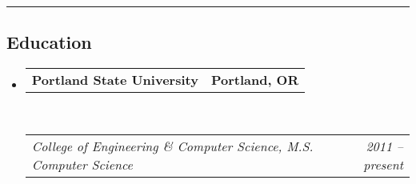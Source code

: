 \documentclass[10pt,letterpaper]{article}
\makeatletter
\newcommand{\headerrow}[2]
{\begin{tabular*}{\linewidth}{l@{\extracolsep{\fill}}r}
	#1 &
	#2 \\
\end{tabular*}}
\makeatother
\begin{document}
\hrule
\vspace{-0.4em}
\subsection*{Education}

\begin{itemize}
	\parskip=0.1em

	\item 
	\headerrow
		{\textbf{Portland State University}}
		{\textbf{Portland, OR}}
	\\
	\headerrow
		{\emph{College of Engineering \& Computer Science, M.S. Computer Science}}
		{\emph{2011 -- present}}



\end{itemize}
\end{document}
